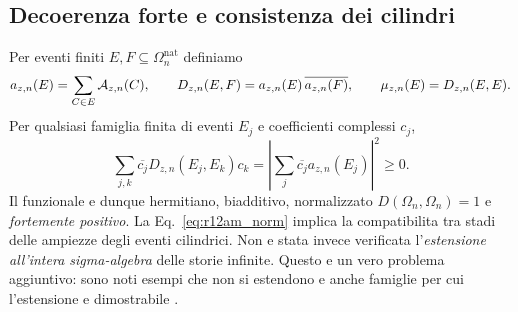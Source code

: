 \documentclass[11pt,a4paper]{article}
\begin{document}
\subsection{Decoerenza forte e consistenza dei cilindri}
Per eventi finiti $E,F\subseteq\Omega_n^{\mathrm{nat}}$ definiamo
\begin{equation}
 a_{z,n}(E)=\sum_{C\in E}{\cal A}_{z,n}(C),\qquad
 D_{z,n}(E,F)=a_{z,n}(E)\,\overline{a_{z,n}(F)},\qquad
 \mu_{z,n}(E)=D_{z,n}(E,E).
 \label{eq:r12am_D}
\end{equation}
Per qualsiasi famiglia finita di eventi $E_j$ e coefficienti complessi $c_j$,
\begin{equation}
 \sum_{j,k}\overline{c_j}D_{z,n}(E_j,E_k)c_k
 =\left|\sum_j\overline{c_j}a_{z,n}(E_j)\right|^2\ge0.
 \label{eq:r12am_positive}
\end{equation}
Il funzionale e dunque hermitiano, biadditivo, normalizzato $D(\Omega_n,\Omega_n)=1$ e \emph{fortemente positivo}. La Eq.~\eqref{eq:r12am_norm} implica la compatibilita tra stadi delle ampiezze degli eventi cilindrici. Non e stata invece verificata l'\emph{estensione all'intera sigma-algebra} delle storie infinite. Questo e un vero problema aggiuntivo: sono noti esempi che non si estendono e anche famiglie per cui l'estensione e dimostrabile \cite{DowkerJohnstonSurya2010,SuryaZalel2020}.
\end{document}
